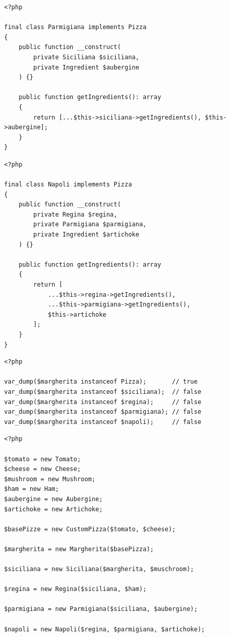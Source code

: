 \begin{frame}[fragile,c]
    \begin{lstlisting}
<?php

final class Parmigiana implements Pizza
{
    public function __construct(
        private Siciliana $siciliana,
        private Ingredient $aubergine
    ) {}

    public function getIngredients(): array
    {
        return [...$this->siciliana->getIngredients(), $this->aubergine];
    }
}
    \end{lstlisting}
\end{frame}

\begin{frame}[fragile,c]
    \begin{lstlisting}
<?php

final class Napoli implements Pizza
{
    public function __construct(
        private Regina $regina,
        private Parmigiana $parmigiana,
        private Ingredient $artichoke
    ) {}

    public function getIngredients(): array
    {
        return [
            ...$this->regina->getIngredients(),
            ...$this->parmigiana->getIngredients(),
            $this->artichoke
        ];
    }
}
    \end{lstlisting}
\end{frame}

\begin{frame}[fragile,c]
    \begin{lstlisting}
<?php

var_dump($margherita instanceof Pizza);       // true
var_dump($margherita instanceof $siciliana);  // false
var_dump($margherita instanceof $regina);     // false
var_dump($margherita instanceof $parmigiana); // false
var_dump($margherita instanceof $napoli);     // false
    \end{lstlisting}
\end{frame}

\begin{frame}[fragile,c]
    \begin{lstlisting}
<?php

$tomato = new Tomato;
$cheese = new Cheese;
$mushroom = new Mushroom;
$ham = new Ham;
$aubergine = new Aubergine;
$artichoke = new Artichoke;

$basePizze = new CustomPizza($tomato, $cheese);

$margherita = new Margherita($basePizza);

$siciliana = new Siciliana($margherita, $muschroom);

$regina = new Regina($siciliana, $ham);

$parmigiana = new Parmigiana($siciliana, $aubergine);

$napoli = new Napoli($regina, $parmigiana, $artichoke);
    \end{lstlisting}
\end{frame}


